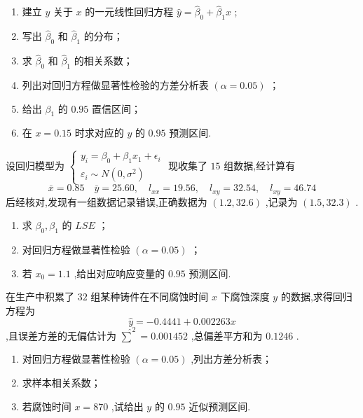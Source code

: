 \begin{xiti}
    \begin{enumerate}
        \item  建立 $y$ 关于 $x$ 的一元线性回归方程 $\hat{y}=\hat{\beta}_0+\hat{\beta}_1x$ ;
        \item 写出 $\hat{\beta}_0$ 和 $\hat{\beta}_1$ 的分布；
        \item 求 $\hat{\beta}_0$ 和 $\hat{\beta}_1$ 的相关系数；
        \item 列出对回归方程做显著性检验的方差分析表 $(\alpha=0.05)$ ；
        \item 给出 $\beta_1$ 的 $0.95$ 置信区间；
        \item 在 $x=0.15$ 时求对应的 $y$ 的 $0.95$ 预测区间.
    \end{enumerate}
    \item 设回归模型为 $\left\{\begin{array}{l}{y_{i}=\beta_{0}+\beta_{1} x_{1}+\epsilon_{i}} \\ {\varepsilon_{i} \sim N\left(0, \sigma^{2}\right)}\end{array}\right.$ 现收集了 $15$ 组数据,经计算有
    \begin{equation}
    \bar{x}=0.85 \quad \bar{y}=25.60, \quad l_{x x}=19.56, \quad l_{x y}=32.54, \quad l_{x y}=46.74
    \end{equation}
    后经核对,发现有一组数据记录错误,正确数据为 $(1.2,32.6)$ ,记录为 $(1.5,32.3)$ .
    \begin{enumerate}
        \item 求 $\beta_0,\beta_1$ 的 $LSE$ ；
        \item 对回归方程做显著性检验 $(\alpha=0.05)$ ；
        \item 若 $x_0=1.1$ ,给出对应响应变量的 $0.95$ 预测区间.
    \end{enumerate}
    \item 在生产中积累了 $32$ 组某种铸件在不同腐蚀时间 $x$ 下腐蚀深度 $y$ 的数据,求得回归方程为
    \begin{equation}
    \hat{y}=-0.4441+0.002263x
    \end{equation}
    ,且误差方差的无偏估计为 $\hat{\sum}^2=0.001452$ ,总偏差平方和为 $0.1246$ .
    \begin{enumerate}
        \item 对回归方程做显著性检验 $(\alpha=0.05)$ ,列出方差分析表；
        \item 求样本相关系数；
        \item 若腐蚀时间 $x=870$ ,试给出 $y$ 的 $0.95$ 近似预测区间.
    \end{enumerate}

\end{xiti}
